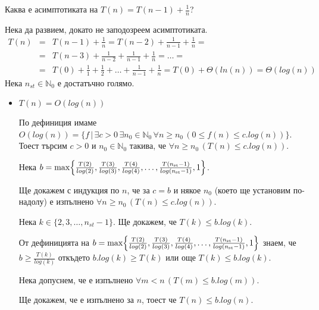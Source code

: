 \begin{problem}
	Каква е асимптотиката на $T(n)=T(n-1)+\frac1n$?
\end{problem}
\begin{solution}
	Нека да развием, докато не заподозреем асимптотиката.
	\begin{eqnarray*}
		T(n)
		&=& T(n-1)+\frac1n=T(n-2)+\frac1{n-1}+\frac1n=\\
		&=& T(n-3)+\frac1{n-2}+\frac1{n-1}+\frac1n=\dots=\\
		&=& T(0)+\frac11+\frac12+\dots+\frac1{n-1}+\frac1n=T(0)+\Theta(ln(n))=\Theta(log(n))
	\end{eqnarray*}
	Нека $n_{st}\in\mathbb{N}_0$ е достатъчно голямо.
	
	\begin{itemize}
		\item $T(n)=O(log(n))$
		
		По $\hyperref[bdef-asymp-classes]{\text{дефиниция}}$ имаме $O(log(n))=\{f\,|\,\exists c>0\,\exists n_0\in\mathbb{N}_0\,\forall n\ge n_0\,(0\le f(n)\le c.log(n))\}$. Тоест търсим $c>0$ и $n_0\in\mathbb{N}_0$ такива, че $\forall n\ge n_0\,(T(n)\le c.log(n))$.
		
		Нека $b=\max\Bigl\{\frac{T(2)}{log(2)},\frac{T(3)}{log(3)},\frac{T(4)}{log(4)},\dots,\frac{T(n_{\text{st}}-1)}{log({n_{\text{st}}-1)}},1\Bigr\}$.%
		
		Ще докажем с индукция по $n$, че за $c=b$ и някое $n_0$ (което ще установим по-надолу) е изпълнено $\forall n\ge n_0\,(T(n)\le c.log(n))$.
		
		\begin{base}
			Нека $k\in\{2,3,\dots,n_{st}-1\}$. Ще докажем, че $T(k)\le b.log(k)$.
			
			От дефиницията на $b=\max\Bigl\{\frac{T(2)}{log(2)},\frac{T(3)}{log(3)},\frac{T(4)}{log(4)},\dots,\frac{T(n_{\text{st}}-1)}{log({n_{\text{st}}-1)}},1\Bigr\}$ знаем, че $b\ge \frac{T(k)}{log(k)}$ откъдето $b.log(k)\ge T(k)$ или още $T(k)\le b.log(k)$.
		\end{base}
	
		\begin{indhypothesis}
			Нека допуснем, че е изпълнено $\forall m<n\,(T(m)\le b.log(m))$.
		\end{indhypothesis}
	
		\begin{indstep}
			Ще докажем, че е изпълнено за $n$, тоест че $T(n)\le b.log(n)$.
			

\end{indstep}
\end{itemize}
\end{solution}
